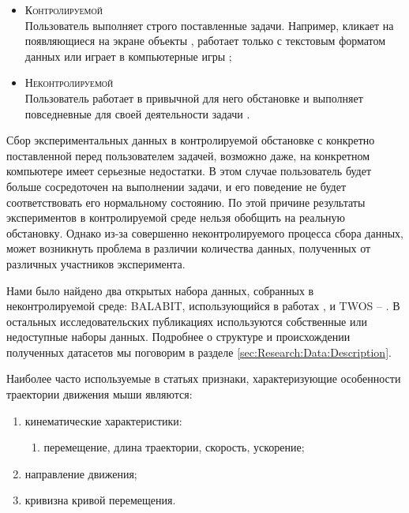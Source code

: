 \documentclass[12pt]{article}
\begin{document}
    \begin{itemize}
        \item \textsc{Контролируемой} \\
        Пользователь выполняет строго поставленные задачи. Например, кликает на появляющиеся на экране объекты \cite{Stokes, Borisov, Shen, Pilankar, Monaro}, работает только с текстовым форматом данных \cite{Fridman, Masri} или играет в компьютерные игры \cite{Kasprowski};
        \item \textsc{Неконтролируемой} \\
        Пользователь работает в привычной для него обстановке и выполняет повседневные для своей деятельности задачи \cite{Mondal, Mondal_2, Mondal_3, Antal, Khalifa, Tan, Chong, Chong2D}.
    \end{itemize}
    
    \par Сбор экспериментальных данных в контролируемой обстановке с конкретно поставленной перед пользователем задачей, возможно даже, на конкретном компьютере имеет серьезные недостатки. В этом случае пользователь будет больше сосредоточен на выполнении задачи, и его поведение не будет соответствовать его нормальному состоянию. По этой причине результаты экспериментов в контролируемой среде нельзя обобщить на реальную обстановку. Однако из-за совершенно неконтролируемого процесса сбора данных, может возникнуть проблема в различии количества данных, полученных от различных участников эксперимента.

    \par Нами было найдено два открытых набора данных, собранных в неконтролируемой среде: BALABIT, использующийся в работах \cite{Antal, Tan, Chong, Chong2D}, и TWOS -- \cite{Tan, Chong, Chong2D}. В остальных исследовательских публикациях используются собственные или недоступные наборы данных. Подробнее о структуре и происхождении полученных датасетов мы поговорим в разделе \ref{sec:Research:Data:Description}.

    \par Наиболее часто используемые в статьях признаки, характеризующие особенности траектории движения мыши являются:

    \begin{enumerate}
        \item кинематические характеристики:
        \begin{enumerate}
            \item перемещение, длина траектории, скорость, ускорение;
        \end{enumerate}
        \item направление движения;
        \item кривизна кривой перемещения.
    \end{enumerate}
    \vspace{10mm}
\end{document}

